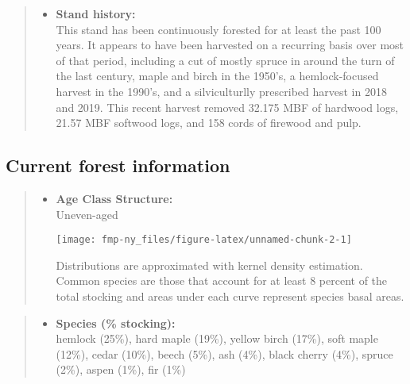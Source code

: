 \documentclass[]{tufte-handout}
\providecommand{\tightlist}{%
  \setlength{\itemsep}{0pt}\setlength{\parskip}{0pt}}
\begin{document}
\begin{quote}
\begin{itemize}
\tightlist
\item
  \textbf{Stand history:}\\
  \vspace{2pt} This stand has been continuously forested for at least
  the past 100 years. It appears to have been harvested on a recurring
  basis over most of that period, including a cut of mostly spruce in
  around the turn of the last century, maple and birch in the 1950's, a
  hemlock-focused harvest in the 1990's, and a silviculturlly prescribed
  harvest in 2018 and 2019. This recent harvest removed 32.175 MBF of
  hardwood logs, 21.57 MBF softwood logs, and 158 cords of firewood and
  pulp.
\end{itemize}
\end{quote}

\subsection{Current forest
information}\label{current-forest-information}

\begin{quote}
\begin{itemize}
\tightlist
\item
  \textbf{Age Class Structure:}\\
  \vspace{2pt} Uneven-aged\\

  \begin{marginfigure}
  \texttt{[image: fmp-ny\_files/figure-latex/unnamed-chunk-2-1]} \caption[Distributions are approximated with kernel density estimation]{Distributions are approximated with kernel density estimation. Common species are those that account for at least 8 percent of the total stocking and areas under each curve represent species basal areas.}\label{fig:unnamed-chunk-2}
  \end{marginfigure}
\end{itemize}
\end{quote}

\begin{quote}
\begin{itemize}
\tightlist
\item
  \textbf{Species (\% stocking):}\\
  \vspace{2pt} hemlock (25\%), hard maple (19\%), yellow birch (17\%),
  soft maple (12\%), cedar (10\%), beech (5\%), ash (4\%), black cherry
  (4\%), spruce (2\%), aspen (1\%), fir (1\%)
\end{itemize}
\end{quote}
\end{document}

